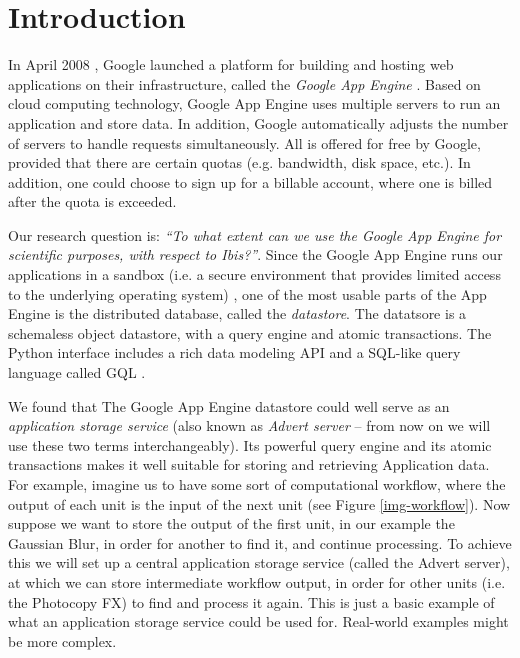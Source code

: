 \section{Introduction}
\label{introduction}
In April 2008 \cite{app-engine-intro}, Google launched a platform for building
and hosting web applications on their infrastructure, called the \emph{Google App
Engine} \cite{app-engine-www}. Based on cloud computing technology, Google App
Engine uses multiple servers to run an application and store data. In addition,
Google automatically adjusts the number of servers to handle requests
simultaneously. All is offered for free by Google, provided that there are
certain quotas (e.g. bandwidth, disk space, etc.). In addition, one could
choose to sign up for a billable account, where one is billed after the quota
is exceeded.

Our research question is: \emph{``To what extent can we use the Google App Engine
for scientific purposes, with respect to Ibis?''}. Since the Google App Engine
runs our applications in a sandbox (i.e. a secure environment that provides
limited access to the underlying operating system) \cite{app-engine-sandbox}, one
of the most usable parts of the App Engine is the distributed database, called
the \emph{datastore}. The datatsore is a schemaless object datastore, with a
query engine and atomic transactions. The Python interface includes a rich data
modeling API and a SQL-like query language called GQL
\cite{app-engine-datastore}.

We found that The Google App Engine datastore could well serve as an
\emph{application storage service} (also known as \emph{Advert server} -- from
now on we will use these two terms interchangeably). Its powerful query engine
and its atomic transactions makes it well suitable for storing and retrieving
Application data. For example, imagine us to have some sort of computational
workflow, where the output of each unit is the input of the next unit (see Figure
\ref{img-workflow}). Now suppose we want to store the output of the first unit,
in our example the Gaussian Blur, in order for another to find it, and continue
processing. To achieve this we will set up a central application storage service
(called the Advert server), at which we can store intermediate workflow output,
in order for other units (i.e. the Photocopy FX) to find and process it again.
This is just a basic example of what an application storage service could be used
for. Real-world examples might be more complex.

